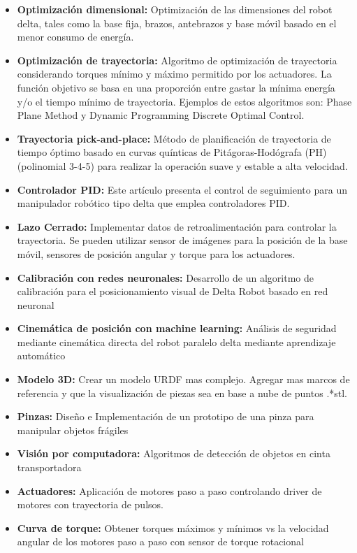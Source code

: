 \begin{itemize}
    \item {\textbf{Optimización dimensional:} Optimización de las dimensiones del robot delta, tales como la base fija, brazos, antebrazos y base móvil basado en el menor consumo de energía.}
    \item {\textbf{Optimización de  trayectoria:} Algoritmo de optimización de trayectoria considerando torques mínimo y máximo permitido por los actuadores. La función objetivo se basa en una proporción entre gastar la mínima energía y/o el tiempo mínimo de trayectoria.  Ejemplos de estos algoritmos son: Phase Plane Method y  Dynamic Programming Discrete Optimal Control.}
    \item {\textbf{Trayectoria pick-and-place:} Método de planificación de trayectoria de tiempo óptimo basado en curvas quínticas de Pitágoras-Hodógrafa (PH) (polinomial 3-4-5) para realizar la operación suave y estable a alta velocidad.}
    \item {\textbf{Controlador PID:} Este artículo presenta el control de seguimiento para un manipulador robótico tipo delta que emplea controladores PID.}
    \item {\textbf{Lazo Cerrado:} Implementar datos de retroalimentación para controlar la trayectoria. Se pueden utilizar sensor de imágenes para la posición de la base móvil, sensores de posición angular y torque para los actuadores.}
    \item {\textbf{Calibración con redes neuronales:} Desarrollo de un algoritmo de calibración para el posicionamiento visual de Delta Robot basado en red neuronal }
    \item {\textbf{Cinemática de posición con machine learning:} Análisis de seguridad mediante cinemática directa del robot paralelo delta mediante aprendizaje automático }
    \item {\textbf{Modelo 3D:} Crear un modelo URDF mas complejo. Agregar mas marcos de referencia y que la visualización de piezas sea en base a nube de puntos .*stl.}
    \item {\textbf{Pinzas:} Diseño e Implementación de un prototipo de una pinza para manipular objetos frágiles}
    \item {\textbf{Visión por computadora:} Algoritmos de detección de objetos en cinta transportadora }
    \item {\textbf{Actuadores:} Aplicación de motores paso a paso controlando driver de motores con trayectoria de pulsos.}
    \item {\textbf{Curva de torque:} Obtener torques máximos y mínimos vs la velocidad angular de los motores paso a paso con sensor de torque rotacional  }


\end{itemize}

\newpage


